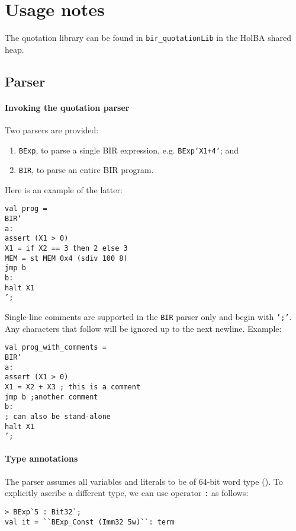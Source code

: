 \documentclass{article}
\begin{document}
\section{Usage notes}

The quotation library can be found in \texttt{bir_quotationLib} in the HolBA
shared heap.

\subsection{Parser}

\paragraph{Invoking the quotation parser} Two parsers are provided:
\begin{enumerate}
\item \texttt{BExp}, to parse a single BIR expression, e.g. \texttt{BExp`X1+4`}; and
\item \texttt{BIR}, to parse an entire BIR program.
\end{enumerate}

Here is an example of the latter:

\begin{verbatim}
val prog =
BIR‘
a:
assert (X1 > 0)
X1 = if X2 == 3 then 2 else 3
MEM = st MEM 0x4 (sdiv 100 8)
jmp b
b:
halt X1
’;
\end{verbatim}

Single-line comments are supported in the \texttt{BIR} parser only and begin
with \texttt{';'}. Any characters that follow will be ignored up to the next
newline. Example:

\begin{verbatim}
val prog_with_comments =
BIR‘
a:
assert (X1 > 0)
X1 = X2 + X3 ; this is a comment
jmp b ;another comment
b:
; can also be stand-alone
halt X1
’;
\end{verbatim}


\paragraph{Type annotations} The parser assumes all variables and literals to be
of 64-bit word type (). To explicitly ascribe a different type, we
can use operator \texttt{:} as follows:

\begin{verbatim}
> BExp`5 : Bit32`;
val it = ``BExp_Const (Imm32 5w)``: term
\end{verbatim}
\end{document}
